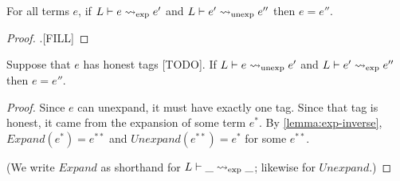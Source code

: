 \begin{lemma} \label{lemma:exp-inverse}
  For all terms $e$, if $L \vdash e \rightsquigarrow_\text{exp} e'$ and
  $L \vdash e' \rightsquigarrow_\text{unexp} e''$ then $e = e''$.
\end{lemma}
\begin{proof}
  .[FILL]
\end{proof}
\begin{corollary}
  Suppose that $e$ has honest tags [TODO].
  If $L \vdash e \rightsquigarrow_\text{unexp} e'$ and $L \vdash e' \rightsquigarrow_\text{exp} e''$
  then $e = e''$.
\end{corollary}
\begin{proof}
  Since $e$ can unexpand, it must have exactly one tag.
  Since that tag is honest, it came from the expansion of some term $e^{*}$.
  By \cref{lemma:exp-inverse}, $Expand(e^{*}) = e^{**}$ 
  and $Unexpand(e^{**}) = e^{*}$ for some $e^{**}$.

  (We write $Expand$ as shorthand for $L \vdash \_ \rightsquigarrow_\text{exp} \_$;
   likewise for $Unexpand$.)
\end{proof}
